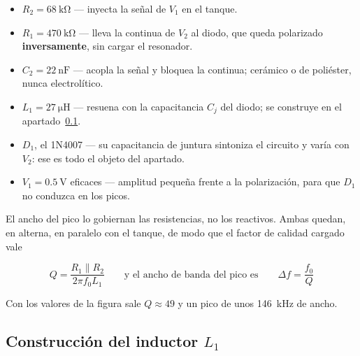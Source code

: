 \documentclass[11pt,a4paper]{article}
\begin{document}
\begin{itemize}[leftmargin=1.4em, itemsep=1pt, topsep=4pt]
    \item $R_2 = \qty{68}{\kilo\ohm}$ --- inyecta la señal de $V_1$ en el tanque.
    \item $R_1 = \qty{470}{\kilo\ohm}$ --- lleva la continua de $V_2$ al diodo, que
          queda polarizado \textbf{inversamente}, sin cargar el resonador.
    \item $C_2 = \qty{22}{\nano\farad}$ --- acopla la señal y bloquea la continua;
          cerámico o de poliéster, nunca electrolítico.
    \item $L_1 = \qty{27}{\micro\henry}$ --- resuena con la capacitancia $C_j$ del
          diodo; se construye en el apartado~\ref{sec:bobina}.
    \item $D_1$, el 1N4007 --- su capacitancia de juntura sintoniza el circuito y varía
          con $V_2$: ese es todo el objeto del apartado.
    \item $V_1 = \qty{0.5}{\volt}$ eficaces --- amplitud pequeña frente a la
          polarización, para que $D_1$ no conduzca en los picos.
\end{itemize}

\noindent El ancho del pico lo gobiernan las resistencias, no los reactivos. Ambas
quedan, en alterna, en paralelo con el tanque, de modo que el factor de calidad cargado
vale

\begin{equation}
    Q = \frac{R_1 \parallel R_2}{2\pi f_0 L_1}
    \qquad\text{y el ancho de banda del pico es}\qquad
    \Delta f = \frac{f_0}{Q}
    \label{eq:q}
\end{equation}

\noindent Con los valores de la figura sale $Q \approx 49$ y un pico de unos
\qty{146}{\kilo\hertz} de ancho.

\FloatBarrier
\subsection{Construcción del inductor \texorpdfstring{$L_1$}{L1}}
\label{sec:bobina}
\end{document}

